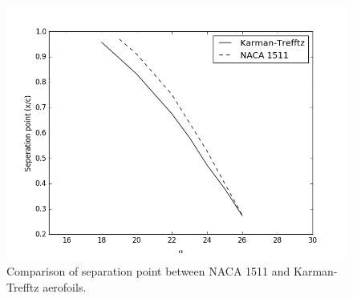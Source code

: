 \documentclass[10pt,a4paper]{article}
\begin{document}
\begin{figure}[!htb]
\centering
\includegraphics[scale=0.55]{Figures/separation_comparison.png}
\caption{Comparison of separation point between NACA 1511 and Karman-Trefftz aerofoils.}
\label{fig:separation_comparison}
\end{figure}
\end{document}
